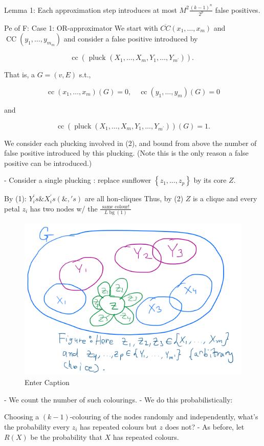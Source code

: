 Lemma 1: Each approximation step introduces at most $M^2 \frac{(k-1)^n}{2^p}$ false positives.

Pe of F: Case 1: OR-approximator
We start with $\overline{C C}\left(x_1, \ldots, x_m\right)$ and $\operatorname{CC}\left(y_1, \ldots, y_{m_m}\right)$ and consider a false positive introduced by

$$
\operatorname{cc}\left(\text { pluck }\left(X_1, \ldots, X_m, Y_1, \ldots, Y_{m^{\prime}}\right)\right) \text {. }
$$


That is, a $G=(v, E)$ s.t.,

$$
\operatorname{cc}\left(x_1, \ldots, x_m\right)(G)=0, \quad \operatorname{cc}\left(y_1, \ldots, y_m\right)(G)=0
$$

and

$$
\operatorname{cc}\left(\operatorname{pluck}\left(X_1, \ldots, X_m, Y_1, \ldots, Y_{m^{\prime}}\right)\right)(G)=1 .
$$


We consider each plucking involved in (2), and bound from above the number of false positive introduced by this plucking. (Note this is the only reason a false positive can be introduced.)


 - Consider a single plucking : replace sunflower $\left\{z_1, \ldots, z_p\right\}$ by its core $Z$.

By (1): $Y_i^{\prime} s \& X_i^{\prime} s(\&, ' s)$
are all hon-cliques
Thus, by (2)
$Z$ is a clique
and every petal $z_i$
has two nodes w/ the $\frac{\text { same colour! }}{L \operatorname{bg}(1)}$



\begin{figure}[H]
    \centering
    \includegraphics[width=.6\linewidth]{images/clique3.png}
    \caption{Enter Caption}
    \label{fig:enter-label}
\end{figure}


- We count the number of such colourings.
- We do this probabilistically:

Choosing a $(k-1)$-colouring of the nodes randomly and independently, what's the probability every $z_i$ has repeated colours but $z$ does not?
- As before, let $R(X)$ be the probability that $X$ has repeated colours.


